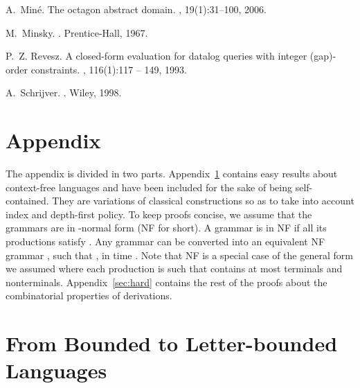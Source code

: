 \documentclass[final]{llncs}
\begin{document}
\begin{thebibliography}{10}
A.~Min{\'{e}}.
\newblock The octagon abstract domain.
, 19(1):31--100, 2006.

M.~Minsky.
.
\newblock Prentice-Hall, 1967.

P.~Z. Revesz.
\newblock A closed-form evaluation for datalog queries with integer (gap)-order
  constraints.
, 116(1):117 -- 149, 1993.

A.~Schrijver.
.
\newblock Wiley, 1998.

\end{thebibliography}



\clearpage
\appendix

\section*{Appendix}

The appendix is divided in two parts. Appendix~\ref{sec:easy} contains
easy results about context-free languages and have been included for the sake of being
self-contained. They are variations of classical constructions so as to
take into account index and depth-first
policy. To keep proofs concise, we assume that the grammars are in -normal form (NF for short).
A grammar is in NF if all its productions  satisfy .
Any grammar  can be converted into an equivalent NF grammar , such that ,
in time  \cite{LL10}. Note that NF is a special case of the general form we assumed
where each production  is such that  contains at most  terminals and  nonterminals.
Appendix~\ref{sec:hard} contains the rest of the proofs about
the combinatorial properties of derivations.

\section{From Bounded to Letter-bounded Languages}\label{sec:easy}
\end{document}
